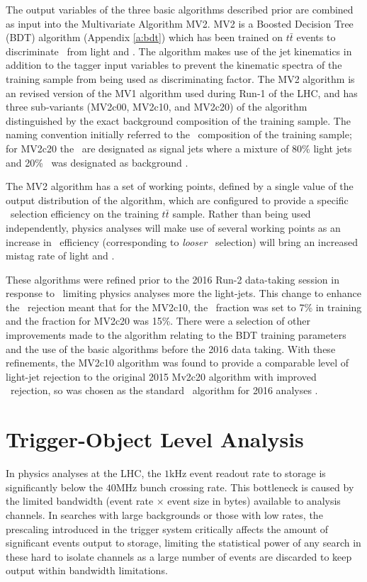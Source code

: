 	The output variables of the three basic algorithms described prior are combined as input into the Multivariate Algorithm MV2. MV2 is a Boosted Decision Tree (BDT) algorithm (Appendix \ref{a:bdt}) which has been trained on $t\bar{t}$ events to discriminate \bjets\ from light and \cjets. The algorithm makes use of the jet kinematics in addition to the tagger input variables to prevent the kinematic spectra of the training sample from being used as discriminating factor. The MV2 algorithm is an revised version of the MV1 algorithm used during Run-1 of the LHC, and has three sub-variants (MV2c00, MV2c10, and MV2c20) of the algorithm distinguished by the exact background composition of the training sample. The naming convention initially referred to the \cjet\ composition of the training sample; for MV2c20 the \bjets\ are designated as signal jets where a mixture of 80\% light jets and 20\% \cjets\ was designated as background \cite{bTagExpPerf}.

	The MV2 algorithm has a set of working points, defined by a single value of the output distribution of the algorithm, which are configured to provide a specific \bjet\ selection efficiency on the training $t\bar{t}$ sample. Rather than being used independently, physics analyses will make use of several working points as an increase in \bjet\ efficiency (corresponding to \textit{looser} \bjet\ selection) will bring an increased mistag rate of light and \cjets.

	These algorithms were refined prior to the 2016 Run-2 data-taking session in response to \cjets\ limiting physics analyses more the light-jets. This change  to enhance the \cjet\ rejection meant that for the MV2c10, the \cjet\ fraction was set to 7\% in training and the fraction for MV2c20 was 15\%. There were a selection of other improvements made to the algorithm relating to the BDT training parameters and the use of the basic algorithms before the 2016 data taking. With these refinements, the MV2c10 algorithm was found to provide a comparable level of light-jet rejection to the original 2015 Mv2c20 algorithm with improved \cjet\ rejection, so was chosen as the standard \btag\ algorithm for 2016 analyses \cite{btagOptimisation}.


\section{Trigger-Object Level Analysis}
\label{t:tla}

	In physics analyses at the LHC, the $1$kHz event readout rate to storage is significantly below the $40$MHz bunch crossing rate. This bottleneck is caused by the limited bandwidth (event rate $\times$ event size in bytes) available to analysis channels. In searches with large backgrounds or those with low rates, the prescaling introduced in the trigger system critically affects the amount of significant events output to storage, limiting the statistical power of any search in these hard to isolate channels as a large number of events are discarded to keep output within bandwidth limitations.

